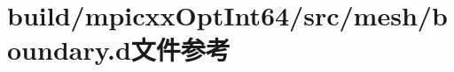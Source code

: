 \hypertarget{build_2mpicxxOptInt64_2src_2mesh_2boundary_8d}{
\section{build/mpicxxOptInt64/src/mesh/boundary.d文件参考}
\label{build_2mpicxxOptInt64_2src_2mesh_2boundary_8d}
}
